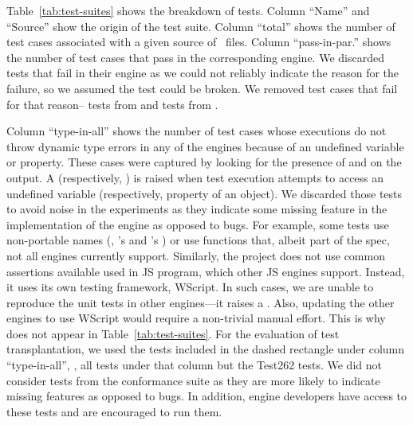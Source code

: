 \documentclass[smallextended]{svjour3}
\begin{document}
Table~\ref{tab:test-suites} shows the breakdown of tests. Column
``Name'' and ``Source'' show the origin of the test suite. Column
``total'' shows the number of test cases associated with a given
source of \js\ files. Column ``pass-in-par.''  shows the number of
test cases that pass in the corresponding engine. We discarded tests
that fail in their engine as we could not reliably indicate the reason
for the failure, so we assumed the test could be broken. We removed
\testsThatFail{} test cases that fail for that
reason--\testsThatFailJSC{} tests from \jsc and \testsThatFailSM{}
tests from \smonkey.

Column ``type-in-all'' shows the number of test cases whose executions
do not throw dynamic type errors in any of the engines because of an
undefined variable or property.  These cases were captured by looking
for the presence of  and  on
the output. A  (respectively,
) is raised when test execution attempts to access
an undefined variable (respectively, property of an object). We
discarded those tests to avoid noise in the experiments as they
indicate some missing feature in the implementation of the engine as
opposed to bugs. For example, some tests use non-portable names
(\eg{}, \jsc's  and \smonkey{}'s
) or use functions that, albeit part of the
spec, not all engines currently support. Similarly, the \chakra
project does not use common assertions available used in JS program,
which other JS engines support. Instead, it uses its own testing
framework, WScript. In such cases, we are unable to reproduce the
\chakra unit tests in other engines---it raises a
. Also, updating the other engines to use
WScript would require a non-trivial manual effort. This is why \chakra
does not appear in Table~\ref{tab:test-suites}. For the evaluation of
test transplantation, we used the
\totalTestFilesForTestTransplantation{} tests included in the dashed
rectangle under column ``type-in-all'', \ie{}, all tests under that
column but the Test262 tests. We did not consider tests from the
conformance suite as they are more likely to indicate missing features
as opposed to bugs. In addition, engine developers have access to
these tests and are encouraged to run them.
\end{document}
